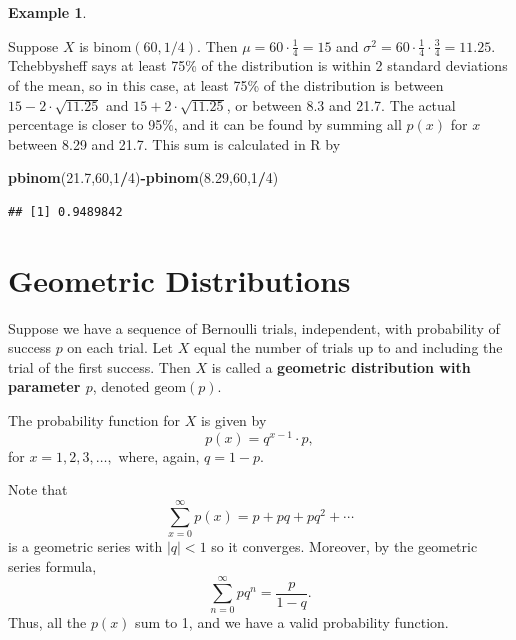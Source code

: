 \documentclass[
]{book}
\newenvironment{Shaded}{\begin{snugshade}}{\end{snugshade}}
\newcommand{\DecValTok}[1]{\textcolor[rgb]{0.00,0.00,0.81}{#1}}
\newcommand{\FloatTok}[1]{\textcolor[rgb]{0.00,0.00,0.81}{#1}}
\newcommand{\FunctionTok}[1]{\textcolor[rgb]{0.13,0.29,0.53}{\textbf{#1}}}
\newcommand{\NormalTok}[1]{#1}
\newcommand{\SpecialCharTok}[1]{\textcolor[rgb]{0.81,0.36,0.00}{\textbf{#1}}}
\theoremstyle{definition}
\theoremstyle{definition}
\newtheorem{example}{Example}[chapter]
\theoremstyle{definition}
\theoremstyle{definition}
\theoremstyle{remark}
\begin{document}
\begin{example}
\protect\hypertarget{exm:binomial-tchebby}{}\label{exm:binomial-tchebby}

Suppose \(X\) is \(\text{binom}(60,1/4)\). Then \(\mu = 60\cdot\frac{1}{4} = 15\) and \(\sigma^2 = 60\cdot \frac{1}{4} \cdot \frac{3}{4} = 11.25.\)
Tchebbysheff says at least 75\% of the distribution is within 2 standard deviations of the mean, so in this case, at least 75\% of the distribution is between \(15 - 2\cdot \sqrt{11.25}\) and \(15 + 2\cdot \sqrt{11.25}\), or between 8.3 and 21.7. The actual percentage is closer to 95\%, and it can be found by summing all \(p(x)\) for \(x\) between 8.29 and 21.7. This sum is calculated in R by

\begin{Shaded}
\begin{Highlighting}[]
\FunctionTok{pbinom}\NormalTok{(}\FloatTok{21.7}\NormalTok{,}\DecValTok{60}\NormalTok{,}\DecValTok{1}\SpecialCharTok{/}\DecValTok{4}\NormalTok{)}\SpecialCharTok{{-}}\FunctionTok{pbinom}\NormalTok{(}\FloatTok{8.29}\NormalTok{,}\DecValTok{60}\NormalTok{,}\DecValTok{1}\SpecialCharTok{/}\DecValTok{4}\NormalTok{)}
\end{Highlighting}
\end{Shaded}

\begin{verbatim}
## [1] 0.9489842
\end{verbatim}

\end{example}

\section{Geometric Distributions}\label{geometric}

Suppose we have a sequence of Bernoulli trials, independent, with probability of success \(p\) on each trial. Let \(X\) equal the number of trials up to and including the trial of the first success. Then \(X\) is called a \textbf{geometric distribution with parameter \(p\)}, denoted \(\text{geom}(p)\).

The probability function for \(X\) is given by \[p(x) = q^{x-1}\cdot p,\] for \(x = 1, 2, 3, \ldots,\) where, again, \(q = 1-p\).

Note that \[\sum_{x=0}^\infty p(x) = p + pq + pq^2 + \cdots\] is a geometric series with \(|q| < 1\) so it converges. Moreover, by the geometric series formula, \[\sum_{n=0}^\infty pq^n = \frac{p}{1-q}.\]
Thus, all the \(p(x)\) sum to 1, and we have a valid probability function.
\end{document}
